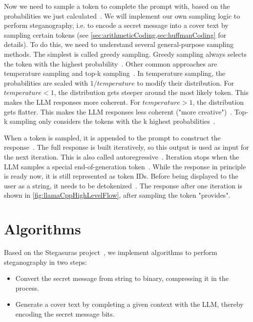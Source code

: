 Now we need to sample a token to complete the prompt with, based on the probabilities we just calculated~\cite{mallisUnderstandingHowLLM2023}. We will implement our own sampling logic to perform steganography, i.e. to encode a secret message into a cover text by sampling certain tokens (see \cref{sec:arithmeticCoding,sec:huffmanCoding} for details). To do this, we need to understand several general-purpose sampling methods. The simplest is called greedy sampling. Greedy sampling always selects the token with the highest probability~\cite{mallisUnderstandingHowLLM2023}. Other common approaches are temperature sampling and top-k sampling~\cite{mallisUnderstandingHowLLM2023}. In temperature sampling, the probabilities are scaled with $1/temperature$ to modify their distribution. For $temperature < 1$, the distribution gets steeper around the most likely token. This makes the \gls{LLM} responses more coherent. For $temperature > 1$, the distribution gets flatter. This makes the \gls{LLM} responses less coherent ("more creative")~\cite{mallisUnderstandingHowLLM2023}. Top-k sampling only considers the tokens with the k highest probabilities~\cite{mallisUnderstandingHowLLM2023}.

When a token is sampled, it is appended to the prompt to construct the response~\cite{mallisUnderstandingHowLLM2023}. The full response is built iteratively, so this output is used as input for the next iteration. This is also called autoregressive~\cite{mallisUnderstandingHowLLM2023}. Iteration stops when the \gls{LLM} samples a special end-of-generation token~\cite{gerganovGgerganovLlamacpp2024}. While the response in principle is ready now, it is still represented as token IDs. Before being displayed to the user as a string, it needs to be detokenized~\cite{mallisUnderstandingHowLLM2023}. The response after one iteration is shown in \cref{fig:llamaCppHighLevelFlow}, after sampling the token "provides".

\section{Algorithms}
\label{sec:algorithms}
Based on the Stegasuras project~\cite{zieglerNeuralLinguisticSteganography2019}, we implement algorithms to perform steganography in two steps:
\begin{itemize}
    \item Convert the secret message from string to binary, compressing it in the process.
    \item Generate a cover text by completing a given context with the \gls{LLM}, thereby encoding the secret message bits.
\end{itemize}


